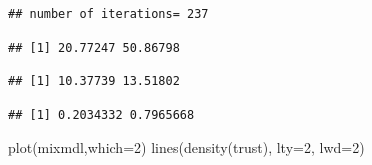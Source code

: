 \documentclass[
]{book}
\newenvironment{Shaded}{\begin{snugshade}}{\end{snugshade}}
\newcommand{\AttributeTok}[1]{\textcolor[rgb]{0.77,0.63,0.00}{#1}}
\newcommand{\DecValTok}[1]{\textcolor[rgb]{0.00,0.00,0.81}{#1}}
\newcommand{\FunctionTok}[1]{\textcolor[rgb]{0.00,0.00,0.00}{#1}}
\newcommand{\NormalTok}[1]{#1}
\newcommand{\OtherTok}[1]{\textcolor[rgb]{0.56,0.35,0.01}{#1}}
\newcommand{\SpecialCharTok}[1]{\textcolor[rgb]{0.00,0.00,0.00}{#1}}
\begin{document}
\begin{Shaded}
\end{Shaded}

\begin{verbatim}
## number of iterations= 237
\end{verbatim}

\begin{Shaded}
\end{Shaded}

\begin{verbatim}
## [1] 20.77247 50.86798
\end{verbatim}

\begin{Shaded}
\end{Shaded}

\begin{verbatim}
## [1] 10.37739 13.51802
\end{verbatim}

\begin{Shaded}
\end{Shaded}

\begin{verbatim}
## [1] 0.2034332 0.7965668
\end{verbatim}

\begin{Shaded}
\begin{Highlighting}[]
\FunctionTok{plot}\NormalTok{(mixmdl,}\AttributeTok{which=}\DecValTok{2}\NormalTok{)}
\FunctionTok{lines}\NormalTok{(}\FunctionTok{density}\NormalTok{(trust), }\AttributeTok{lty=}\DecValTok{2}\NormalTok{, }\AttributeTok{lwd=}\DecValTok{2}\NormalTok{)}
\end{Highlighting}
\end{Shaded}
\end{document}
